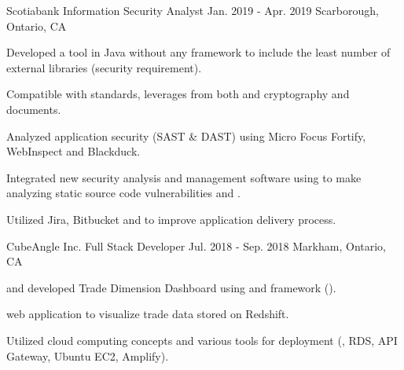\begin{cventries}
  \cventry
    {Scotiabank} %
    {Information Security Analyst} %
    {Jan. 2019 - Apr. 2019} %
    {Scarborough, Ontario, CA} %
    {
      \begin{cvitems} %
        \item {Developed a  tool in Java without any framework to include the least number of external libraries (security requirement).}
          \begin{cvsubitems}
            \item {Compatible with  standards, leverages from both  and  cryptography and  documents.}
          \end{cvsubitems}
        \item {Analyzed application security (SAST \& DAST) using Micro Focus Fortify, WebInspect and Blackduck.}
        \item {Integrated new security analysis and management software using  to make analyzing static source code vulnerabilities  and .}
          \begin{cvsubitems}
            \item {Utilized Jira, Bitbucket and  to improve application delivery process.}
          \end{cvsubitems}
      \end{cvitems}
    }

  \cventry
    {CubeAngle Inc.} %
    {Full Stack Developer} %
    {Jul. 2018 - Sep. 2018} %
    {Markham, Ontario, CA} %
    {
      \begin{cvitems} %
        \item { and developed Trade Dimension Dashboard using  and  framework ().}
          \begin{cvsubitems}
            \item { web application to visualize trade data stored on  Redshift.}
          \end{cvsubitems}
        \item {Utilized cloud computing concepts and various  tools for deployment (, RDS, API Gateway, Ubuntu EC2, Amplify).}
      \end{cvitems}
    }


\end{cventries}
